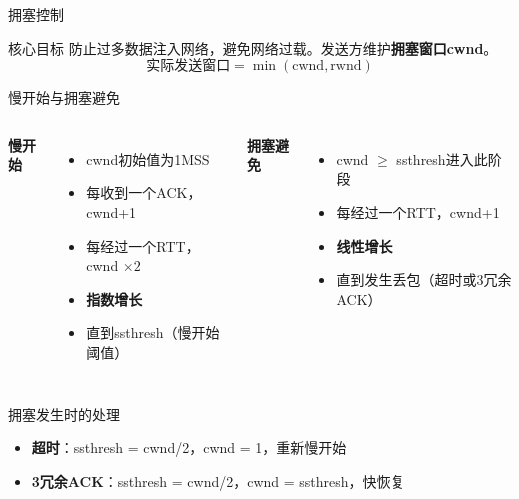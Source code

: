 \documentclass[10pt, aspectratio=169]{beamer}
\begin{document}
\begin{frame}{拥塞控制}
    \begin{block}{核心目标}
        防止过多数据注入网络，避免网络过载。发送方维护\textbf{拥塞窗口cwnd}。
        \[
        \text{实际发送窗口} = \min(\text{cwnd}, \text{rwnd})
        \]
    \end{block}
    \vspace{0.3em}
    \begin{center}
    \end{center}
\end{frame}

\begin{frame}{慢开始与拥塞避免}
    \begin{columns}[t]
        \textbf{慢开始}
        \begin{itemize}
            \item cwnd初始值为1MSS
            \item 每收到一个ACK，cwnd+1
            \item 每经过一个RTT，cwnd $\times 2$
            \item \textbf{指数增长}
            \item 直到ssthresh（慢开始阈值）
        \end{itemize}
        \textbf{拥塞避免}
        \begin{itemize}
            \item cwnd $\ge$ ssthresh进入此阶段
            \item 每经过一个RTT，cwnd+1
            \item \textbf{线性增长}
            \item 直到发生丢包（超时或3冗余ACK）
        \end{itemize}
    \end{columns}
    \vspace{0.5em}
    \begin{exampleblock}{拥塞发生时的处理}
        \begin{itemize}
            \item \textbf{超时}：ssthresh = cwnd/2，cwnd = 1，重新慢开始
            \item \textbf{3冗余ACK}：ssthresh = cwnd/2，cwnd = ssthresh，快恢复
        \end{itemize}
    \end{exampleblock}
\end{frame}
\end{document}
